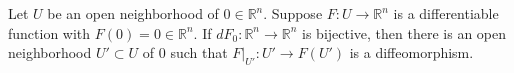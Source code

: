 Let $U$ be an open neighborhood of $0 \in \mathbb{R}^n$. Suppose $F: U \rightarrow \mathbb{R}^n$ is a differentiable function with $F(0) = 0 \in \mathbb{R}^n$. If $dF_0: \mathbb{R}^n \rightarrow \mathbb{R}^n$ is bijective, then there is an open neighborhood $U' \subset U$ of $0$ such that $F|_{U'}: U' \rightarrow F(U')$ is a diffeomorphism.
